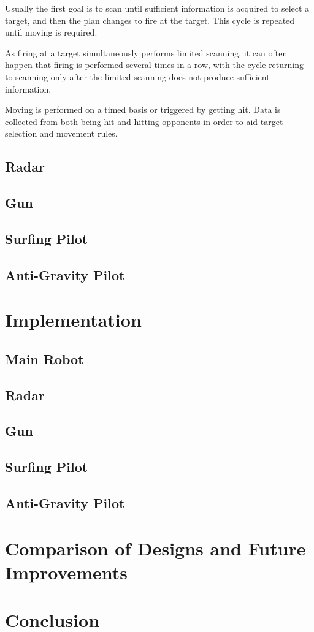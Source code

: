 \documentclass[11pt]{report}
\begin{document}
Usually the first goal is to scan until sufficient information is acquired to select a target, and then the plan changes to fire at the target. This cycle is repeated until moving is required.

As firing at a target simultaneously performs limited scanning, it can often happen that firing is performed several times in a row, with the cycle returning to scanning only after the limited scanning does not produce sufficient information.

Moving is performed on a timed basis or triggered by getting hit. Data is collected from both being hit and hitting opponents in order to aid target selection and movement rules.

\section{Radar}


\section{Gun}
\section{Surfing Pilot}
\section{Anti-Gravity Pilot}

\chapter{Implementation} %
\section{Main Robot}
\section{Radar}
\section{Gun}
\section{Surfing Pilot}
\section{Anti-Gravity Pilot}

\chapter{Comparison of Designs and Future Improvements}

\chapter{Conclusion} %

\nocite{*}
\printbibliography
\end{document}
